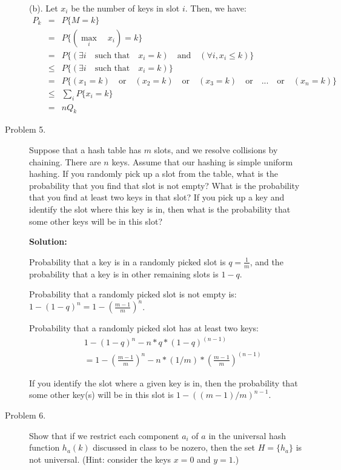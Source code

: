 \documentclass[11pt]{article}
\begin{document}
\begin{description}
(b). Let $x_i$ be the number of keys in slot $i$. Then, we have:
\begin{eqnarray}
P_k &=& P\{M=k\} \\
&=& P\{(\max_i \quad x_i)=k\} \\
&=& P\{(\exists i \quad \mbox{such that}\quad x_i=k) \quad \mbox{and} \quad
(\forall i, x_i \le k)\} \\
&\le& P\{(\exists i \quad \mbox{such that}\quad x_i=k)\} \\
&=& P\{ (x_1=k) \quad \mbox{or} \quad (x_2=k) \quad \mbox{or} \quad (x_3=k)
\quad \mbox{or} \quad ... \quad \mbox{or} \quad  (x_n=k) \} \\
&\le& \sum_{i} P\{ x_i=k \} \\
&=& nQ_k
\end{eqnarray}



\item[Problem 5.]
Suppose that a hash table has $m$ slots, and we resolve collisions by chaining. There are $n$ keys.
Assume that our hashing is simple uniform hashing. If you randomly pick up a slot from the table,
what is the probability that you find that slot is not empty? What is the probability that you find
at least two keys in that slot? If you pick up a key and identify the slot where this key is in,
then what is the probability that some other keys will be in this slot?


\noindent \textbf{Solution:}

Probability that a key is in a randomly picked slot is $q=\frac{1}{m}$, and the
probability that a key is in other remaining slots is $1-q$.

Probability that a randomly picked slot is not empty is:
$1-(1-q)^n=1-(\frac{m-1}{m})^n$.

Probability that a randomly picked slot has at least two keys:
\begin{eqnarray}
&1-(1-q)^n-n*q*(1-q)^{(n-1)} \nonumber \\
&=1-(\frac{m-1}{m})^n- n*(1/m)*(\frac{m-1}{m})^{(n-1)} \nonumber
\end{eqnarray}

If you identify the slot where a given key is in, then the probability that
some other key(s) will be in this slot is $1-((m-1)/m)^{n-1}$.


\item[Problem 6.]
Show that if we restrict each component $a_i$ of $a$ in the universal hash function $h_a(k)$
discussed in class to be nozero, then the set $H=\{h_a\}$ is not universal. (Hint: consider the
keys $x=0$ and $y=1$.)


\end{description}
\end{document}

